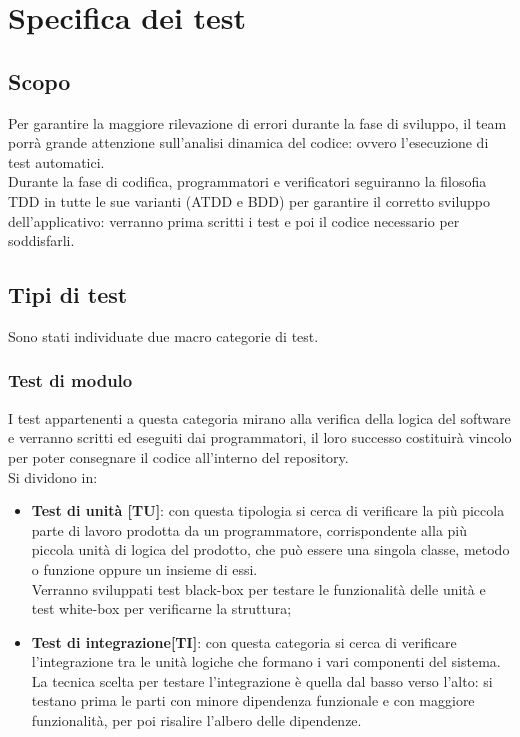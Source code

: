 \documentclass[PianoDiProgetto.tex]{subfiles}
\begin{document}
\chapter{Specifica dei test}

\section{Scopo}
Per garantire la maggiore rilevazione di errori durante la fase di sviluppo, il team porrà grande attenzione sull'analisi dinamica del codice: ovvero l'esecuzione di test automatici. \\
Durante la fase di codifica, programmatori e verificatori seguiranno la filosofia TDD in tutte le sue varianti (ATDD e BDD) per garantire il corretto sviluppo dell'applicativo: verranno prima scritti i test e poi il codice necessario per soddisfarli.

\section{Tipi di test}
Sono stati individuate due macro categorie di test.

\subsection{Test di modulo}
I test appartenenti a questa categoria mirano alla verifica della logica del software e verranno scritti ed eseguiti dai programmatori, il loro successo costituirà vincolo per poter consegnare il codice all'interno del repository. \\
Si dividono in:
\begin{itemize}
	\item \textbf{Test di unità [TU]}: con questa tipologia si cerca di verificare la più piccola parte di lavoro prodotta da un programmatore, corrispondente alla più piccola unità di logica del prodotto, che può essere una singola classe, metodo o funzione oppure un insieme di essi. \\
	Verranno sviluppati test black-box per testare le funzionalità delle unità e test white-box per verificarne la struttura;
	\item \textbf{Test di integrazione[TI]}: con questa categoria si cerca di verificare l'integrazione tra le unità logiche che formano i vari componenti del sistema.\\
	La tecnica scelta per testare l'integrazione è quella dal basso verso l'alto: si testano prima le parti con minore dipendenza funzionale e con maggiore funzionalità, per poi risalire l'albero delle dipendenze.\\
\end{itemize}
\end{document}
